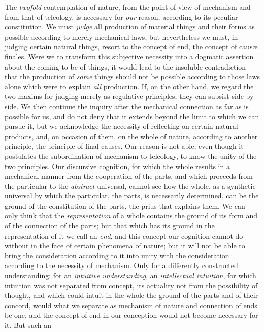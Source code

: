 The \emph{twofold} contemplation of nature, from the point of view of
mechanism and from that of teleology, is necessary for \emph{our}
reason, according to its peculiar constitution. We must \emph{judge}
all production of material things and their forms as possible according
to merely mechanical laws, but nevertheless we must, in judging certain
natural things, resort to the concept of end, the concept of causæ
finales. Were we to transform this subjective necessity into a dogmatic
assertion about the coming-to-be of things, it would lead to the
insoluble contradiction that the production of \emph{some} things
should not be possible according to those laws alone which were to
explain \emph{all} production. If, on the other hand, we regard the two
maxims for judging merely as regulative principles, they can subsist
side by side. We then continue the inquiry after the mechanical
connection as far as is possible for us, and do not deny that it
extends beyond the limit to which we can pursue it, but we acknowledge
the necessity of reflecting on certain natural products, and, on
occasion of them, on the whole of nature, according to another
principle, the principle of final causes. Our reason is not able, even
though it postulates the subordination of mechanism to teleology, to
know the unity of the two principles. Our discursive cognition, for
which the whole results in a mechanical manner from the cooperation of
the parts, and which proceeds from the particular to the
\emph{abstract} universal, cannot see how the whole, as a
synthetic-universal by which the particular, the parts, is necessarily
determined, can be the ground of the constitution of the parts, the
prius that explains them. We can only think that the
\emph{representation} of a whole contains the ground of its form and of
the connection of the parts; but that which has its ground
in the representation of it we call an \emph{end}, and this concept our
cognition cannot do without in the face of certain phenomena of nature;
but it will not be able to bring the consideration according to it into
unity with the consideration according to the necessity of mechanism.
Only for a differently constructed understanding: for an
\emph{intuitive understanding}, an \emph{intellectual intuition}, for
which intuition was not separated from concept, its actuality not from
the possibility of thought, and which could intuit in the whole the
ground of the parts and of their concord, would what we separate as
mechanism of nature and connection of ends be one, and the concept of
end in our conception would not become necessary for it. But such an
